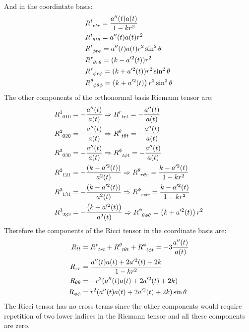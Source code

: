 \documentclass[12pt,a4]{article}
\begin{document}
\begin{enumerate}
    And in the coordintate basis:
    \begin{align*}
      &\tensor{R}{^t_r_t_r} = \frac{a''(t)a(t)}{1 - k r^2}\\
      &\tensor{R}{^t_\theta_t_\theta} = a''(t)a(t) r^2\\
      &\tensor{R}{^t_\phi_t_\phi} = a''(t)a(t)r^2 \sin^2 \theta \\
      &\tensor{R}{^r_\theta_r_\theta} =  (k - a'^2(t))r^2 \\
      &\tensor{R}{^r_\phi_r_\phi} =      (k + a'^2(t)) r^2 \sin^2 \theta\\
      &\tensor{R}{^\theta_\phi_\theta_\phi} =  \left( k + a'^2(t) \right) r^2 \sin ^2 \theta 
    \end{align*}
    The other components of the orthonormal basis Riemann tensor are:
    \begin{align*}
      &\tensor{R}{^1_0_1_0} = -\frac{a''(t)}{a(t)} \Rightarrow \tensor{R}{^r_t_r_t} = -\frac{a''(t)}{a(t)} \\
      &\tensor{R}{^2_0_2_0} = -\frac{a''(t)}{a(t)} \Rightarrow \tensor{R}{^\theta_t_\theta_t} = -\frac{a''(t)}{a(t)} \\
      &\tensor{R}{^3_0_3_0} = -\frac{a''(t)}{a(t)} \Rightarrow \tensor{R}{^\phi_t_\phi_t} = -\frac{a''(t)}{a(t)}\\
      &\tensor{R}{^2_1_2_1} = - \frac{(k - a'^2(t))}{a^2(t)} \Rightarrow \tensor{R}{^\theta_r_\theta_r} = \frac{k - a'^2(t)}{1 - kr^2}\\
      &\tensor{R}{^3_1_3_1} = - \frac{(k - a'^2(t))}{a^2(t)} \Rightarrow \tensor{R}{^\phi_r_\phi_r} = \frac{k - a'^2(t)}{1 - kr^2}\\
      &\tensor{R}{^3_2_3_2} = - \frac{\left( k + a'^2(t) \right)}{a^2(t)} \Rightarrow \tensor{R}{^\phi_\theta_\phi_\theta} = \left( k + a'^2(t) \right) r^2
    \end{align*}
    Therefore the components of the Ricci tensor in the coordinate basis are:
    \begin{align*}
      R_{t t} &= \tensor{R}{^r_t _r _t} + \tensor{R}{^\theta_t_\theta_t} + \tensor{R}{^\phi_t_\phi_t}= - 3 \frac{a''(t)}{a(t)}\\
      R_{r r} &= \frac{a''(t)a(t) + 2a'^2(t) + 2k}{1 - k r^2}\\
      R_{\theta \theta} &= -r^2(a''(t) a(t) + 2a'^2(t) + 2 k)\\
      R_{\phi\phi} &= r^2 (a''(t) a(t) + 2a'^2(t) + 2 k) \sin\theta
    \end{align*}
    The Ricci tensor has no cross terms since the other components would require repetition of two lower indices in the Riemann tensor and all these components are zero.
\end{enumerate}
\end{document}
